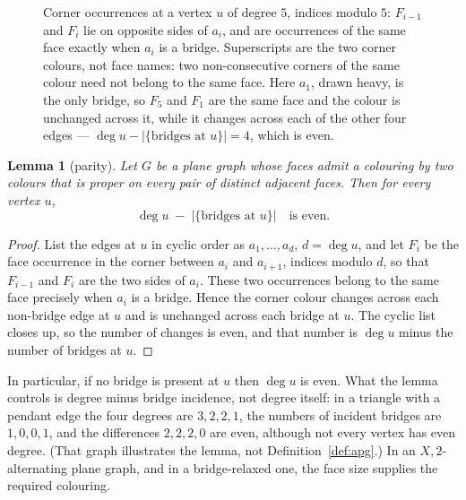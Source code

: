 \documentclass{baustms}
\theoremstyle{cupthm}
\newtheorem{lemma}[theorem]{Lemma}
\theoremstyle{cupdefn}
\theoremstyle{cuprem}
\begin{document}
\begin{figure}[ht]
\centering
{}
\caption{Corner occurrences at a vertex $u$ of degree $5$, indices modulo $5$:
$F_{i-1}$ and $F_{i}$ lie on opposite sides of $a_{i}$, and are occurrences of
the same face exactly when $a_{i}$ is a bridge. Superscripts are the two corner
colours, not face names: two non-consecutive corners of the same colour need not
belong to the same face. Here $a_{1}$, drawn heavy, is the only bridge, so
$F_{5}$ and $F_{1}$ are the same face and the colour is unchanged across it,
while it changes across each of the other four edges ---
$\deg u - |\{\text{bridges at } u\}| = 4$, which is even.}\label{fig:corners}
\end{figure}

\begin{lemma}[parity]\label{lem:parity}
Let $G$ be a plane graph whose faces admit a colouring by two colours that is
proper on every pair of distinct adjacent faces. Then for every vertex $u$,
\[
  \deg u \;-\; \bigl|\{\text{bridges at } u\}\bigr| \quad\text{is even.}
\]
\end{lemma}

\begin{proof}
List the edges at $u$ in cyclic order as $a_1,\dots,a_d$, $d = \deg u$, and let
$F_i$ be the face occurrence in the corner between $a_i$ and $a_{i+1}$, indices
modulo $d$, so that $F_{i-1}$ and $F_i$ are the two sides of $a_i$. These two
occurrences belong to the same face precisely when $a_i$ is a bridge. Hence the
corner colour changes across each non-bridge edge at $u$ and is unchanged across
each bridge at $u$. The cyclic list closes up, so the number of changes is even,
and that number is $\deg u$ minus the number of bridges at $u$.
\end{proof}

In particular, if no bridge is present at $u$ then $\deg u$ is even. What the
lemma controls is degree minus bridge incidence, not degree itself: in a triangle
with a pendant edge the four degrees are $3,2,2,1$, the numbers of incident
bridges are $1,0,0,1$, and the differences $2,2,2,0$ are even, although not every
vertex has even degree. (That graph illustrates the lemma, not
Definition~\ref{def:apg}.) In an $X,2$-alternating plane graph, and in a
bridge-relaxed one, the face size supplies the required colouring.
\end{document}
